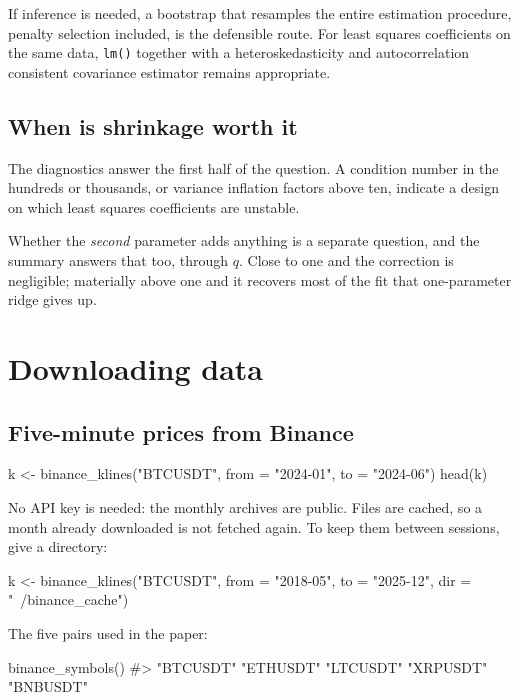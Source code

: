 \documentclass[11pt,a4paper]{report}
\begin{document}
If inference is needed, a bootstrap that resamples the entire estimation
procedure, penalty selection included, is the defensible route. For
least squares coefficients on the same data, \texttt{lm()} together with
a heteroskedasticity and autocorrelation consistent covariance estimator
remains appropriate.

\section{When is shrinkage worth it}

The diagnostics answer the first half of the question. A condition
number in the hundreds or thousands, or variance inflation factors above
ten, indicate a design on which least squares coefficients are unstable.

Whether the \emph{second} parameter adds anything is a separate question,
and the summary answers that too, through $q$. Close to one and the
correction is negligible; materially above one and it recovers most of
the fit that one-parameter ridge gives up.

\chapter{Downloading data}

\section{Five-minute prices from Binance}

\begin{Rblock}
k <- binance_klines("BTCUSDT", from = "2024-01", to = "2024-06")
head(k)
\end{Rblock}

No API key is needed: the monthly archives are public. Files are cached,
so a month already downloaded is not fetched again. To keep them between
sessions, give a directory:

\begin{Rblock}
k <- binance_klines("BTCUSDT", from = "2018-05", to = "2025-12",
                    dir = "~/binance_cache")
\end{Rblock}

The five pairs used in the paper:

\begin{Rblock}
binance_symbols()
#> "BTCUSDT" "ETHUSDT" "LTCUSDT" "XRPUSDT" "BNBUSDT"
\end{Rblock}
\end{document}
